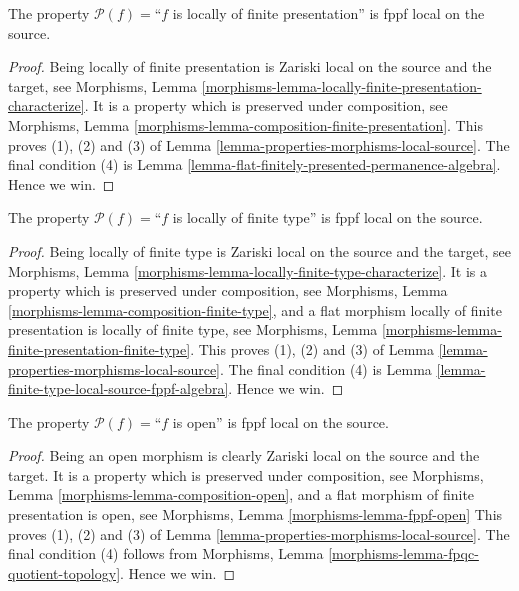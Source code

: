 \begin{lemma}
\label{lemma-locally-finite-presentation-fppf-local-source}
The property $\mathcal{P}(f)=$``$f$ is locally of finite presentation''
is fppf local on the source.
\end{lemma}

\begin{proof}
Being locally of finite presentation is Zariski local on the source
and the target, see Morphisms,
Lemma \ref{morphisms-lemma-locally-finite-presentation-characterize}.
It is a property which is preserved under composition, see
Morphisms, Lemma \ref{morphisms-lemma-composition-finite-presentation}.
This proves
(1), (2) and (3) of Lemma \ref{lemma-properties-morphisms-local-source}.
The final condition (4) is
Lemma \ref{lemma-flat-finitely-presented-permanence-algebra}. Hence we win.
\end{proof}

\begin{lemma}
\label{lemma-locally-finite-type-fppf-local-source}
The property $\mathcal{P}(f)=$``$f$ is locally of finite type''
is fppf local on the source.
\end{lemma}

\begin{proof}
Being locally of finite type is Zariski local on the source
and the target, see Morphisms,
Lemma \ref{morphisms-lemma-locally-finite-type-characterize}.
It is a property which is preserved under composition, see
Morphisms, Lemma \ref{morphisms-lemma-composition-finite-type}, and
a flat morphism locally of finite presentation is locally of finite type, see
Morphisms, Lemma \ref{morphisms-lemma-finite-presentation-finite-type}.
This proves
(1), (2) and (3) of Lemma \ref{lemma-properties-morphisms-local-source}.
The final condition (4) is
Lemma \ref{lemma-finite-type-local-source-fppf-algebra}. Hence we win.
\end{proof}

\begin{lemma}
\label{lemma-open-fppf-local-source}
The property $\mathcal{P}(f)=$``$f$ is open''
is fppf local on the source.
\end{lemma}

\begin{proof}
Being an open morphism is clearly Zariski local on the source and the target.
It is a property which is preserved under composition, see
Morphisms, Lemma \ref{morphisms-lemma-composition-open}, and
a flat morphism of finite presentation is open, see
Morphisms, Lemma \ref{morphisms-lemma-fppf-open}
This proves
(1), (2) and (3) of Lemma \ref{lemma-properties-morphisms-local-source}.
The final condition (4) follows from
Morphisms, Lemma \ref{morphisms-lemma-fpqc-quotient-topology}.
Hence we win.
\end{proof}

